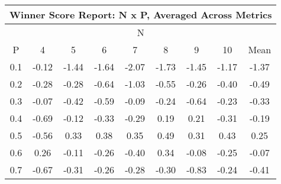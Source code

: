 \begin{longtable}{ | c || c | c | c | c | c | c | c || c |}
\hline
\multicolumn{9}{|c|}{ Winner Score Report: N x P, Averaged Across Metrics } \\
\hline
\multicolumn{9}{|c|}{ N } \\
\hline
P & 4 & 5 & 6 & 7 & 8 & 9 & 10 & Mean\\
\hline
\hline
\endhead
0.1 &  \cellcolor[HTML]{FFFFFF} -0.12 &  \cellcolor[HTML]{FFD7D7} -1.44 &  \cellcolor[HTML]{FFD7D7} -1.64 &  \cellcolor[HTML]{FFC7C7} -2.07 &  \cellcolor[HTML]{FFD7D7} -1.73 &  \cellcolor[HTML]{FFD7D7} -1.45 &  \cellcolor[HTML]{FFDFDF} -1.17 &  \cellcolor[HTML]{FFDFDF} -1.37 \\
0.2 &  \cellcolor[HTML]{FFF7F7} -0.28 &  \cellcolor[HTML]{FFF7F7} -0.28 &  \cellcolor[HTML]{FFEFEF} -0.64 &  \cellcolor[HTML]{FFE7E7} -1.03 &  \cellcolor[HTML]{FFEFEF} -0.55 &  \cellcolor[HTML]{FFF7F7} -0.26 &  \cellcolor[HTML]{FFF7F7} -0.40 &  \cellcolor[HTML]{FFEFEF} -0.49 \\
0.3 &  \cellcolor[HTML]{FFFFFF} -0.07 &  \cellcolor[HTML]{FFF7F7} -0.42 &  \cellcolor[HTML]{FFEFEF} -0.59 &  \cellcolor[HTML]{FFFFFF} -0.09 &  \cellcolor[HTML]{FFF7F7} -0.24 &  \cellcolor[HTML]{FFEFEF} -0.64 &  \cellcolor[HTML]{FFF7F7} -0.23 &  \cellcolor[HTML]{FFF7F7} -0.33 \\
0.4 &  \cellcolor[HTML]{FFEFEF} -0.69 &  \cellcolor[HTML]{FFFFFF} -0.12 &  \cellcolor[HTML]{FFF7F7} -0.33 &  \cellcolor[HTML]{FFF7F7} -0.29 &  \cellcolor[HTML]{F7F7FF} 0.19 &  \cellcolor[HTML]{F7F7FF} 0.21 &  \cellcolor[HTML]{FFF7F7} -0.31 &  \cellcolor[HTML]{FFF7F7} -0.19 \\
0.5 &  \cellcolor[HTML]{FFEFEF} -0.56 &  \cellcolor[HTML]{F7F7FF} 0.33 &  \cellcolor[HTML]{F7F7FF} 0.38 &  \cellcolor[HTML]{F7F7FF} 0.35 &  \cellcolor[HTML]{EFEFFF} 0.49 &  \cellcolor[HTML]{F7F7FF} 0.31 &  \cellcolor[HTML]{F7F7FF} 0.43 &  \cellcolor[HTML]{F7F7FF} 0.25 \\
0.6 &  \cellcolor[HTML]{F7F7FF} 0.26 &  \cellcolor[HTML]{FFFFFF} -0.11 &  \cellcolor[HTML]{FFF7F7} -0.26 &  \cellcolor[HTML]{FFF7F7} -0.40 &  \cellcolor[HTML]{F7F7FF} 0.34 &  \cellcolor[HTML]{FFFFFF} -0.08 &  \cellcolor[HTML]{FFF7F7} -0.25 &  \cellcolor[HTML]{FFFFFF} -0.07 \\
0.7 &  \cellcolor[HTML]{FFEFEF} -0.67 &  \cellcolor[HTML]{FFF7F7} -0.31 &  \cellcolor[HTML]{FFF7F7} -0.26 &  \cellcolor[HTML]{FFF7F7} -0.28 &  \cellcolor[HTML]{FFF7F7} -0.30 &  \cellcolor[HTML]{FFE7E7} -0.83 &  \cellcolor[HTML]{FFF7F7} -0.24 &  \cellcolor[HTML]{FFF7F7} -0.41 \\

\end{longtable}
